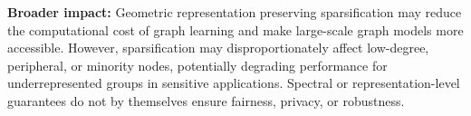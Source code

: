 \documentclass{article}
\begin{document}
\newline
\textbf{Broader impact:}
Geometric representation preserving sparsification may reduce the computational cost of graph learning and make large-scale graph models more accessible. However, sparsification may disproportionately affect low-degree, peripheral, or minority nodes, potentially degrading performance for underrepresented groups in sensitive applications. Spectral or representation-level guarantees do not by themselves ensure fairness, privacy, or robustness.


\end{document}
